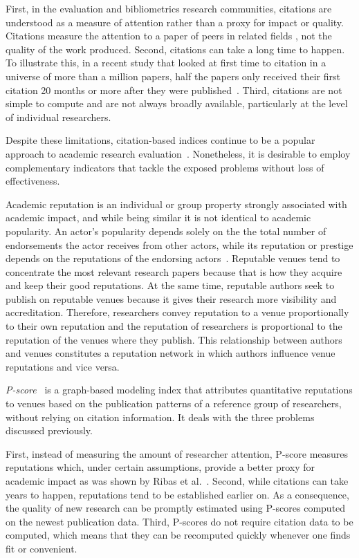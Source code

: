 \documentclass[notitlepage]{svjour3}
\begin{document}
First, in the evaluation and bibliometrics research communities, citations are understood
as a measure of attention rather than a proxy for impact or quality. Citations measure 
the attention to a paper of peers in related fields \cite{Loach2015}, not the quality of the 
work produced. Second, citations can take a long time to happen. To illustrate this, in a recent
study that looked at first time to citation in a universe of more than a million papers, half the 
papers only received their first citation 20 months or more after they were
published~\cite{Nane2012}. Third, citations are not simple to compute and are not always broadly
available, particularly at the level of individual researchers.

Despite these limitations, citation-based indices continue to be a popular approach to
academic research evaluation~\cite{Kellner2008}.
Nonetheless, it is desirable to employ
complementary indicators that tackle the exposed problems without loss of effectiveness.

Academic reputation is an individual or group property strongly associated with 
academic impact, and while being similar it is not identical to academic popularity. An 
actor's popularity depends solely on the the total number of endorsements
the actor receives from other actors, while its reputation or prestige depends on the 
reputations of the endorsing actors~\cite{Bollen2006}. Reputable venues tend to 
concentrate the most relevant research papers 
because that is how they acquire and keep their good reputations. At the same time, 
reputable authors seek to publish on reputable venues because it gives their 
research more visibility and accreditation. Therefore, researchers convey reputation
to a venue proportionally to their own reputation and the reputation of researchers
is proportional to the reputation of the venues where they publish.
This relationship between authors and venues constitutes a reputation network in which 
authors influence venue reputations and vice versa. 

{\em P-score}~\cite{Ribas2015a} is a graph-based modeling index that attributes quantitative
reputations to venues based on the publication patterns of a reference group of researchers,
without relying on citation information. It deals with the three problems discussed previously. 

First, instead of measuring the amount of researcher attention, P-score measures reputations
which, under certain assumptions, provide a better proxy for academic impact as was shown by 
Ribas et al.~\cite{Ribas2015a}. Second, while citations can take years to happen, reputations 
tend to be established earlier on. As a consequence, the quality of new research can be 
promptly estimated using P-scores computed on the newest publication data. Third, P-scores do
not require citation data to be computed, which means that they can be recomputed quickly whenever one finds fit or convenient.
\end{document}
